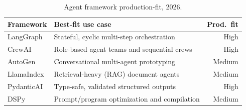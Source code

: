 \begin{table}[htbp]
\centering
\caption{Agent framework production-fit, 2026.}
\label{tab:frameworks}
\begin{tabularx}{\linewidth}{l X r}
\toprule
Framework & Best-fit use case & Prod.\ fit \\
\midrule
LangGraph  & Stateful, cyclic multi-step orchestration   & High   \\
CrewAI     & Role-based agent teams and sequential crews & High   \\
AutoGen    & Conversational multi-agent prototyping      & Medium \\
LlamaIndex & Retrieval-heavy (RAG) document agents       & Medium \\
PydanticAI & Type-safe, validated structured outputs     & High   \\
DSPy       & Prompt/program optimization and compilation & Medium \\
\bottomrule
\end{tabularx}
\end{table}

